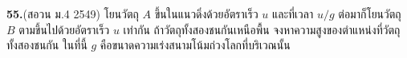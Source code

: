 \par\noindent\textbf{55.}\quad (สอวน ม.4 2549) โยนวัตถุ $A$ ขึ้นในแนวดิ่งด้วยอัตราเร็ว $u$ และที่เวลา $u/g$ ต่อมาก็โยนวัตถุ $B$ ตามขึ้นไปด้วยอัตราเร็ว $u$ เท่ากัน ถ้าวัตถุทั้งสองชนกันเหนือพื้น จงหาความสูงของตำแหน่งที่วัตถุทั้งสองชนกัน ในที่นี้ $g$ คือขนาดความเร่งสนามโน้มถ่วงโลกที่บริเวณนั้น\par\medskip

